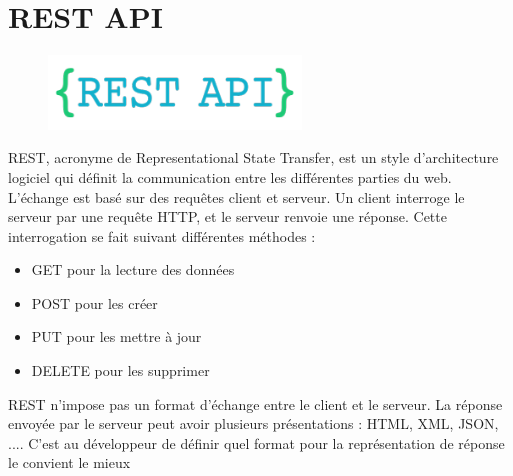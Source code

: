 \chapter{REST API}
\begin{figure}[h!]  
 \centering
    \includegraphics[width=0.6\textwidth]{annexe/Figures/rest.png}
\end{figure}
REST, acronyme de Representational State Transfer, est un style d’architecture logiciel qui définit la communication entre les différentes parties du web. L’échange est basé sur des requêtes client et serveur. Un client interroge le serveur par une requête HTTP, et le serveur renvoie une réponse. Cette interrogation se fait suivant différentes méthodes : 
\begin{itemize}[label=\textbullet]
\item GET pour la lecture des données
\item POST pour les créer
\item PUT pour les mettre à jour 
\item DELETE pour les supprimer
\end{itemize}

REST n’impose pas un format d’échange entre le client et le serveur. La réponse envoyée par le serveur peut avoir plusieurs présentations : HTML, XML, JSON, .... C’est au développeur de définir quel format pour la représentation de réponse le convient le mieux